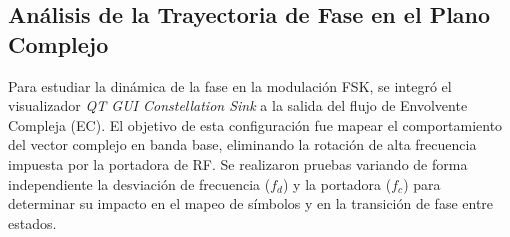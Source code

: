 \subsection{Análisis de la Trayectoria de Fase en el Plano Complejo}
Para estudiar la dinámica de la fase en la modulación FSK, se integró el visualizador \textit{QT GUI Constellation Sink} a la salida del flujo de Envolvente Compleja (EC). El objetivo de esta configuración fue mapear el comportamiento del vector complejo en banda base, eliminando la rotación de alta frecuencia impuesta por la portadora de RF. Se realizaron pruebas variando de forma independiente la desviación de frecuencia ($f_d$) y la portadora ($f_c$) para determinar su impacto en el mapeo de símbolos y en la transición de fase entre estados.